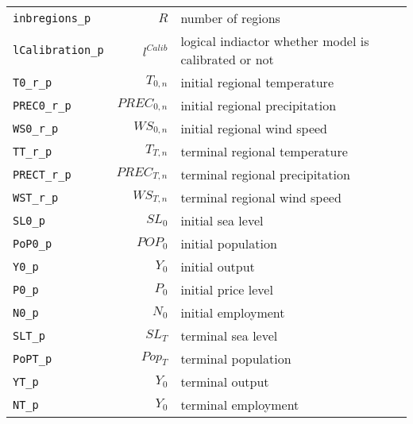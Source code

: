 \begin{center}
\begin{longtable}{lrl}
\texttt{inbregions\_p} & ${R}$ & number of regions\\
\texttt{lCalibration\_p} & ${l^{Calib}}$ & logical indiactor whether model is calibrated or not\\
\texttt{T0\_r\_p} & ${T_{0,n}}$ & initial regional temperature\\
\texttt{PREC0\_r\_p} & ${PREC_{0,n}}$ & initial regional precipitation\\
\texttt{WS0\_r\_p} & ${WS_{0,n}}$ & initial regional wind speed\\
\texttt{TT\_r\_p} & ${T_{T,n}}$ & terminal regional temperature\\
\texttt{PRECT\_r\_p} & ${PREC_{T,n}}$ & terminal regional precipitation\\
\texttt{WST\_r\_p} & ${WS_{T,n}}$ & terminal regional wind speed\\
\texttt{SL0\_p} & ${SL_0}$ & initial sea level\\
\texttt{PoP0\_p} & ${POP_0}$ & initial population\\
\texttt{Y0\_p} & ${Y_0}$ & initial output\\
\texttt{P0\_p} & ${P_0}$ & initial price level\\
\texttt{N0\_p} & ${N_0}$ & initial employment\\
\texttt{SLT\_p} & ${SL_T}$ & terminal sea level\\
\texttt{PoPT\_p} & ${Pop_T}$ & terminal population\\
\texttt{YT\_p} & ${Y_0}$ & terminal output\\
\texttt{NT\_p} & ${Y_0}$ & terminal employment\\
\hline%
\end{longtable}
\end{center}
